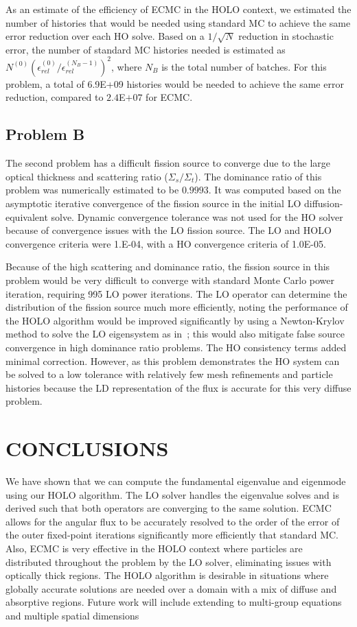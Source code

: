 \documentclass[10pt,twocolumn,pdftex,superscriptaddress]{anstrans}
\newcommand{\sig}[1]{\ensuremath{\Sigma_{#1}}}
\begin{document}
As an estimate of the
efficiency of ECMC in the HOLO context, we estimated the number of histories that would be needed
using standard MC to achieve the same error reduction over each HO solve.  Based on
a $1/\sqrt{N}$ reduction in stochastic error, 
the number of standard MC histories needed is estimated as
$N^{(0)}(\epsilon_{rel}^{(0)}/\epsilon^{(N_B-1)}_{rel})^2$, where $N_B$ is the total
number of batches.  For this problem, a total
of 6.9E+09 histories would be needed to achieve the same error reduction, compared to
$2.4$E$+07$ for ECMC.  

\subsection*{Problem B}

The second problem has a difficult fission source to converge due to the large optical
thickness and scattering ratio ($\sig s/ \sig t$).  The dominance
ratio of this
problem was numerically
estimated to be $0.9993$.  It was computed based on the
asymptotic iterative convergence of the fission source in the initial LO
diffusion-equivalent solve.  Dynamic convergence tolerance was not used for the HO solver because of convergence
issues with the LO fission source.  The LO and HOLO convergence criteria were 1.E-04,
with a HO convergence criteria of 1.0E-05.

Because of the high scattering and dominance ratio, the fission
source in this problem would be very difficult to converge with standard Monte
Carlo power iteration, requiring 995 LO power iterations.
The LO operator can determine the distribution of the fission source much more
efficiently, noting the performance of the HOLO algorithm would be improved significantly by using a Newton-Krylov
method to solve the LO eigensystem as in~\cite{willert}; this would also mitigate
false source convergence in high dominance ratio problems.  The HO consistency terms
added minimal correction.  However, as this problem demonstrates the HO system can be solved to a low tolerance with relatively few mesh refinements
and particle histories because the LD representation of the flux is accurate for this very
diffuse problem.  

\section*{CONCLUSIONS}

We have shown that we can compute the fundamental eigenvalue and eigenmode using our
HOLO algorithm.  The LO solver handles the eigenvalue solves and is derived such that
both operators are converging to the same solution.  ECMC allows for the angular flux
to be accurately resolved to the order of the error of the outer fixed-point
iterations significantly more efficiently that standard MC.  Also, ECMC is very effective in the HOLO context where
particles are distributed throughout the problem by the LO solver, eliminating issues with optically
thick regions.  The HOLO algorithm is desirable in situations where globally accurate
solutions are needed over a domain with a mix of diffuse and absorptive regions.
Future work will include extending to multi-group equations and multiple spatial
dimensions 
\end{document}

